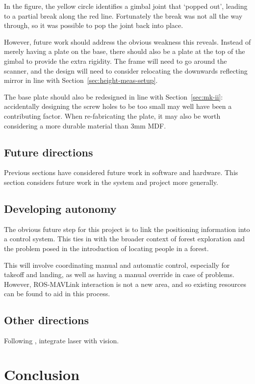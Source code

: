 \documentclass[12pt,oneside,a4paper]{book}
\begin{document}
In the figure, the yellow circle identifies a gimbal joint that
`popped out', leading to a partial break along the red
line. Fortunately the break was not all the way through, so it was
possible to pop the joint back into place.

However, future work should address the obvious weakness this
reveals. Instead of merely having a plate on the base, there should
also be a plate at the top of the gimbal to provide the extra
rigidity. The frame will need to go around the scanner, and the design
will need to consider relocating the downwards reflecting mirror in
line with Section~\ref{sec:height-meas-setup}.

The base plate should also be redesigned in line with
Section~\ref{sec:mk-ii}: accidentally designing the screw holes to be
too small may well have been a contributing factor. When re-fabricating
the plate, it may also be worth considering a more durable material
than 3mm MDF.

\section{Future directions}
\label{sec:future-work}

Previous sections have considered future work in software and
hardware. This section considers future work in the system and project
more generally.

\section{Developing autonomy}
\label{sec:developing-autonomy}

The obvious future step for this project is to link the positioning
information into a control system. This ties in with the broader
context of forest exploration and the problem posed in the
introduction of locating people in a forest.

This will involve coordinating manual and automatic control,
especially for takeoff and landing, as well as having a manual
override in case of problems. However, ROS-MAVLink interaction is not
a new area, and so existing resources can be found to aid in this process.

\section{Other directions}
\label{sec:other-directions}

Following \cite{achtelik2009stereo}, integrate laser with vision.

\chapter{Conclusion}
\label{cha:conclusion}



%

\backmatter


\end{document}
